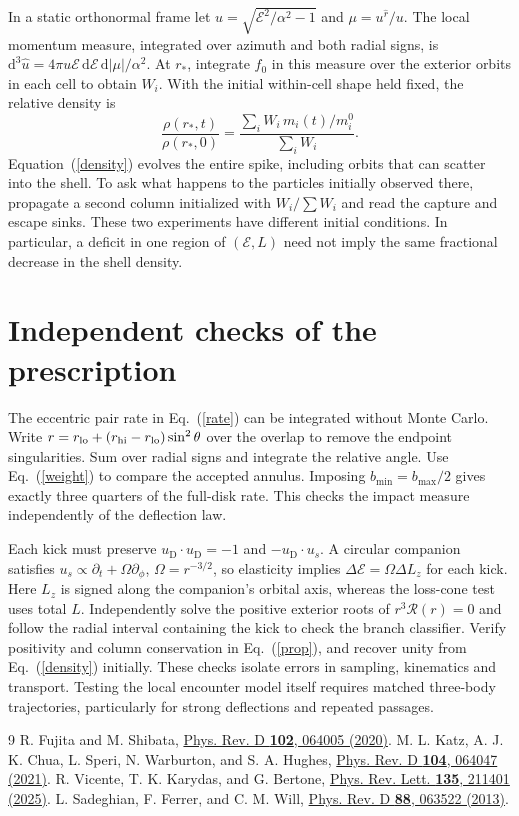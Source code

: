 \documentclass[aps,prd,reprint,amsmath,amssymb,nofootinbib]{revtex4-2}
\newcommand{\E}{\mathcal E}
\newcommand{\dd}{\mathrm{d}}
\newcommand{\DM}{\mathrm D}
\begin{document}
In a static orthonormal frame let $u=\sqrt{\E^2/\alpha^2-1}$ and $\mu=u^{\hat r}/u$. The local momentum measure, integrated over azimuth and both radial signs, is $\dd^3\hat u=4\pi u\E\,\dd\E\,\dd|\mu|/\alpha^2$. At $r_*$, integrate $f_0$ in this measure over the exterior orbits in each cell to obtain $W_i$. With the initial within-cell shape held fixed, the relative density is
\begin{equation}
 \frac{\rho(r_*,t)}{\rho(r_*,0)}=
 \frac{\sum_iW_i\,m_i(t)/m_i^0}{\sum_iW_i}.
 \label{density}
\end{equation}
Equation~(\ref{density}) evolves the entire spike, including orbits that can scatter into the shell. To ask what happens to the particles initially observed there, propagate a second column initialized with $W_i/\sum W_i$ and read the capture and escape sinks. These two experiments have different initial conditions. In particular, a deficit in one region of $(\E,L)$ need not imply the same fractional decrease in the shell density.

\appendix
\section{Independent checks of the prescription}
The eccentric pair rate in Eq.~(\ref{rate}) can be integrated without Monte Carlo. Write $r=r_{\rm lo}+(r_{\rm hi}-r_{\rm lo})\sin^2\theta$ over the overlap to remove the endpoint singularities. Sum over radial signs and integrate the relative angle. Use Eq.~(\ref{weight}) to compare the accepted annulus. Imposing $b_{\min}=b_{\max}/2$ gives exactly three quarters of the full-disk rate. This checks the impact measure independently of the deflection law.

Each kick must preserve $u_\DM\cdot u_\DM=-1$ and $-u_\DM\cdot u_s$. A circular companion satisfies $u_s\propto\partial_t+\Omega\partial_\phi$, $\Omega=r^{-3/2}$, so elasticity implies $\Delta\E=\Omega\Delta L_z$ for each kick. Here $L_z$ is signed along the companion's orbital axis, whereas the loss-cone test uses total $L$. Independently solve the positive exterior roots of $r^3\mathcal R(r)=0$ and follow the radial interval containing the kick to check the branch classifier. Verify positivity and column conservation in Eq.~(\ref{prop}), and recover unity from Eq.~(\ref{density}) initially. These checks isolate errors in sampling, kinematics and transport. Testing the local encounter model itself requires matched three-body trajectories, particularly for strong deflections and repeated passages.

\begin{thebibliography}{9}
 R. Fujita and M. Shibata, \href{https://doi.org/10.1103/PhysRevD.102.064005}{Phys. Rev. D \textbf{102}, 064005 (2020)}.
 M. L. Katz, A. J. K. Chua, L. Speri, N. Warburton, and S. A. Hughes, \href{https://arxiv.org/abs/2104.04582}{Phys. Rev. D \textbf{104}, 064047 (2021)}.
 R. Vicente, T. K. Karydas, and G. Bertone, \href{https://arxiv.org/abs/2505.09715}{Phys. Rev. Lett. \textbf{135}, 211401 (2025)}.
 L. Sadeghian, F. Ferrer, and C. M. Will, \href{https://doi.org/10.1103/PhysRevD.88.063522}{Phys. Rev. D \textbf{88}, 063522 (2013)}.
\end{thebibliography}
\end{document}
